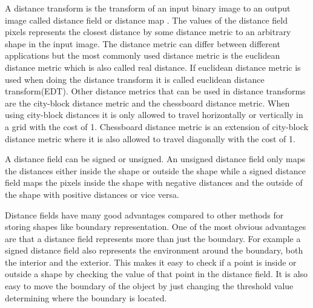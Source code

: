 A distance transform is the transform of an input binary image to an output image called distance field or distance map \citep{rosenfeld1966}. The values of the distance field pixels represents the closest distance by some distance metric to an arbitrary shape in the input image. The distance metric can differ between different applications but the most commonly used distance metric is the euclidean distance metric which is also called real distance. If euclidean distance metric is used when doing the distance transform it is called euclidean distance transform(EDT). Other distance metrics that can be used in distance transforms are the city-block distance metric and the chessboard distance metric. When using city-block distances it is only allowed to travel horizontally or vertically in a grid with the cost of 1. Chessboard distance metric is an extension of city-block distance metric where it is also allowed to travel diagonally with the cost of 1. 

A distance field can be signed or unsigned. An unsigned distance field only maps the distances either inside the shape or outside the shape while a signed distance field maps the pixels inside the shape with negative distances and the outside of the shape with positive distances or vice versa.

Distance fields have many good advantages compared to other methods for storing shapes like boundary representation. One of the most obvious advantages are that a distance field represents more than just the boundary. For example a signed distance field also represents the environment around the boundary, both the interior and the exterior. This makes it easy to check if a point is inside or outside a shape by checking the value of that point in the distance field. It is also easy to move the boundary of the object by just changing the threshold value determining where the boundary is located. \citep{Jones2006}

